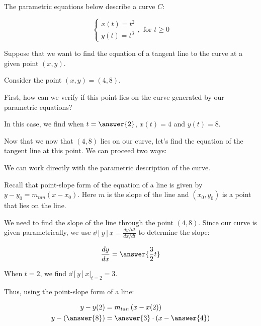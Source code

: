 \documentclass{ximera}
\author{Jim Talamo and Jason Miller}
\begin{document}
\begin{exercise}
The parametric equations below describe a curve $C$: 

\[
\begin{cases}
x(t) = t^2\\
y(t) = t^3
\end{cases} , \textrm{ for } t \geq 0
\]

Suppose that we want to find the equation of a tangent line to the curve at a given point $(x,y)$.  

Consider the point $(x,y) = (4,8)$.  

First, how can we verify if this point lies on the curve generated by our parametric equations? 

\begin{multipleChoice}
\end{multipleChoice}

In this case, we find when $t=\answer{2}$, $x(t) = 4$ and $y(t) =8$. 

Now that we now that $(4,8)$ lies on our curve, let's find the equation of the tangent line at this point.  We can proceed two ways:
\begin{exercise}
We can work directly with the parametric description of the curve.

Recall that point-slope form of the equation of a line is given by $y-y_{0}=m_{tan}(x-x_{0})$. Here $m$ is the slope of the line and $(x_{0}, y_{0})$ is a point that lies on the line. 

We need to find the slope of the line through the point $(4,8)$. Since our curve is given parametrically, we use $\dd[y]{x}=\frac{dy/dt}{dx/dt}$ to determine the slope:

\[ \dd[y]{x}=\answer{\frac{3}{2}t} \] 

When $t=2$, we find $\dd[y]{x} \bigg|_{t=2}= 3$.  

Thus, using the point-slope form of a line:

\begin{align*}
y-y(2)& = m_{tan}\left(x-x(2)\right) \\
y-\left(\answer{8}\right)& =\answer{3} \cdot \left(x-\answer{4}\right) \\
\end{align*}


\end{exercise}
\end{exercise}
\end{document}
